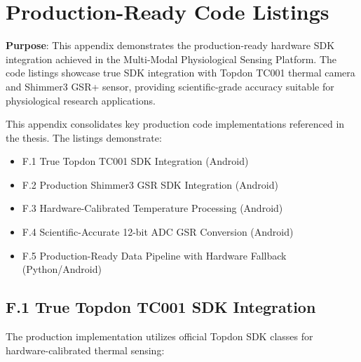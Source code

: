 \chapter{Production-Ready Code Listings}

\textbf{Purpose}: This appendix demonstrates the production-ready hardware SDK integration achieved in the Multi-Modal Physiological Sensing Platform. The code listings showcase true SDK integration with Topdon TC001 thermal camera and Shimmer3 GSR+ sensor, providing scientific-grade accuracy suitable for physiological research applications.

This appendix consolidates key production code implementations referenced in the thesis. The listings demonstrate:

\begin{itemize}
    \item F.1 True Topdon TC001 SDK Integration (Android)
    \item F.2 Production Shimmer3 GSR SDK Integration (Android)
    \item F.3 Hardware-Calibrated Temperature Processing (Android)
    \item F.4 Scientific-Accurate 12-bit ADC GSR Conversion (Android)
    \item F.5 Production-Ready Data Pipeline with Hardware Fallback (Python/Android)
\end{itemize}

\section{F.1 True Topdon TC001 SDK Integration}

The production implementation utilizes official Topdon SDK classes for hardware-calibrated thermal sensing:

